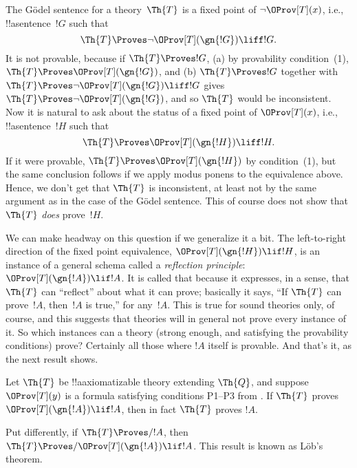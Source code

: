 \documentclass[../../../include/open-logic-section]{subfiles}
\begin{document}


The G\"odel sentence for a theory~$\Th{T}$ is a fixed point of $\lnot
\OProv[T](x)$, i.e., !!a{sentence}~$!G$ such that
\[
\Th{T} \Proves \lnot \OProv[T](\gn{!G}) \liff !G.
\]
It is not provable, because if $\Th{T} \Proves !G$, (a) by provability
condition~(1), $\Th{T} \Proves \OProv[T](\gn{!G})$, and (b) $\Th{T}
\Proves !G$ together with $\Th{T} \Proves \lnot \OProv[T](\gn{!G})
\liff !G$ gives $\Th{T} \Proves \lnot \OProv[T](\gn{!G})$, and so
$\Th{T}$ would be inconsistent.  Now it is natural to ask about the
status of a fixed point of $\OProv[T](x)$, i.e., !!a{sentence}~$!H$
such that
\[
\Th{T} \Proves \OProv[T](\gn{!H}) \liff !H.
\]
If it were provable, $\Th{T} \Proves \OProv[T](\gn{!H})$ by
condition~(1), but the same conclusion follows if we apply modus
ponens to the equivalence above. Hence, we don't get that $\Th{T}$ is
inconsistent, at least not by the same argument as in the case of the
G\"odel sentence. This of course does not show that $\Th{T}$
\emph{does} prove~$!H$.

We can make headway on this question if we generalize it a bit. The
left-to-right direction of the fixed point equivalence,
$\OProv[T](\gn{!H}) \lif !H$, is an instance of a general schema
called a \emph{reflection principle}: $\OProv[T](\gn{!A}) \lif !A$.
It is called that because it expresses, in a sense, that $\Th{T}$ can
``reflect'' about what it can prove; basically it says, ``If $\Th{T}$
can prove~$!A$, then~$!A$ is true,'' for any~$!A$.  This is true for
sound theories only, of course, and this suggests that theories will
in general not prove every instance of it.  So which instances can a
theory (strong enough, and satisfying the provability conditions)
prove?  Certainly all those where $!A$ itself is provable. And that's
it, as the next result shows.

\begin{thm}
Let $\Th{T}$ be !!a{axiomatizable} theory extending $\Th{Q}$, and
suppose $\OProv[T](y)$ is a formula satisfying conditions P1--P3 from
. If $\Th{T}$ proves $\OProv[T](\gn{!A}) \lif !A$,
then in fact $\Th{T}$ proves $!A$.
\end{thm}

Put differently, if $\Th{T} \Proves/ !A$, then $\Th{T} \Proves/
\OProv[T](\gn{!A}) \lif !A$. This result is known as L\"ob's
theorem.
\end{document}
